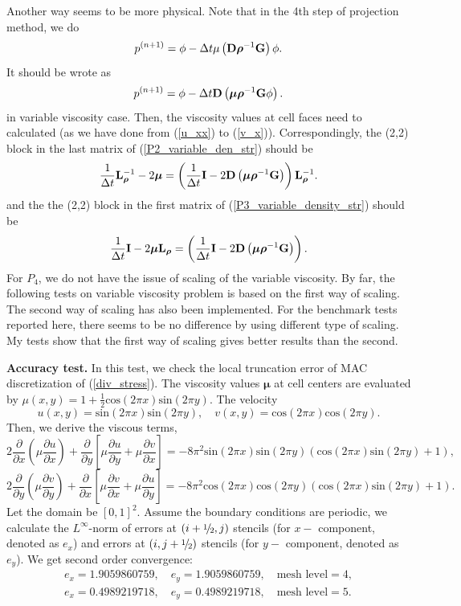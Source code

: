\documentclass[9pt]{article}
\newcommand{\V}[1]{\boldsymbol{#1}}
\newcommand{\sfrac}[2]{\mathchoice
  {\kern0em\raise.5ex\hbox{\the\scriptfont0 #1}\kern-.15em/
   \kern-.15em\lower.25ex\hbox{\the\scriptfont0 #2}}
  {\kern0em\raise.5ex\hbox{\the\scriptfont0 #1}\kern-.15em/
   \kern-.15em\lower.25ex\hbox{\the\scriptfont0 #2}}
  {\kern0em\raise.5ex\hbox{\the\scriptscriptfont0 #1}\kern-.2em/
   \kern-.15em\lower.25ex\hbox{\the\scriptscriptfont0 #2}}
  {#1\!/#2}}
\def\myhalf {\sfrac{1}{2}}
\begin{document}
Another way seems to be more physical. Note that in the 4th step of projection method, we do
$$
p^{(n+1)}=\phi -  \Delta t \mu  \left({\bf D} {\V{\rho}}^{-1} {\bf G} \right)\phi.
$$
It should be wrote as
\begin{equation}\label{pressure_correction_var}
p^{(n+1)}=\phi -  \Delta t  {\bf D}\left({{\V{\mu}}\V{\rho}}^{-1} {\bf G} \phi \right).
\end{equation}
in variable viscosity case. Then, the viscosity values at cell faces need to calculated (as we have done from (\ref{u_xx}) to (\ref{v_x})). Correspondingly, the (2,2) block in the last matrix of (\ref{P2_variable_den_str}) should be
$$
\displaystyle \frac{1}{\Delta t} {\bf L}_{\V{\rho}}^{-1} - 2{\V{\mu}}=\left(\frac{1}{\Delta t}{\bf I}  - 2{\bf D}\left({{\V{\mu}}\V{\rho}}^{-1} {\bf G}\right)\right){\bf L}_{\V{\rho}}^{-1}.
$$
and the the (2,2) block in the first matrix of (\ref{P3_variable_density_str}) should be
$$
\displaystyle \frac{1}{\Delta t}{\bf I}- 2{\V{\mu}} {\bf L}_{\V{\rho}}=\left(\frac{1}{\Delta t}{\bf I}- 2{\bf D}\left({{\V{\mu}}\V{\rho}}^{-1} {\bf G}\right)\right).
$$
For $P_4$, we do not have the issue of scaling of the variable viscosity. By far, the following tests on variable viscosity problem is based on the first way of scaling. The second way of scaling has also been implemented. For the benchmark tests reported here, there seems to be no difference by using different type of scaling. My tests show that the first way of scaling gives better results than the second.

{\bf Accuracy test.} In this test, we check the local truncation error of MAC discretization of (\ref{div_stress}).
The viscosity values ${\V{\mu}}$ at cell centers are evaluated by $\mu(x, y)=1+\frac{1}{2}\mbox{cos}(2 \pi x)\mbox{sin}(2\pi y)$. The velocity
$$
u(x, y)=\mbox{sin}(2\pi x)\mbox{sin}(2 \pi y), \quad v(x, y)=\mbox{cos}(2 \pi x)\mbox{cos}(2 \pi y).
$$
Then, we derive the viscous terms,
$$
2\frac{\partial}{\partial x}\left(\mu \frac{\partial u}{\partial x}\right) + \frac{\partial}{\partial y}\left[\mu \frac{\partial u}{\partial y} + \mu \frac{\partial v}{\partial x}\right]=-8 {\pi}^2 \mbox{sin}(2 \pi x) \mbox{sin}(2 \pi y)(\mbox{cos}(2 \pi x) \mbox{sin}(2 \pi y)+1),
$$
$$
2\frac{\partial}{\partial y}\left(\mu \frac{\partial v}{\partial y}\right) + \frac{\partial}{\partial x}\left[\mu \frac{\partial v}{\partial x} + \mu \frac{\partial u}{\partial y}\right]=-8 {\pi}^2 \mbox{cos}(2 \pi x)\mbox{cos}(2 \pi y) (\mbox{cos}(2 \pi x)\mbox{sin}(2 \pi y)+1).
$$
Let the domain be $[0, 1]^2$. Assume the boundary conditions are periodic, we calculate the $L^{\infty}$-norm of errors at $(i+\myhalf, j)$ stencils (for $x-$ component, denoted as $e_x$) and errors at $(i, j+\myhalf)$ stencils (for $y-$ component, denoted as $e_y$).
We get second order convergence:
$$
\begin{array}{ccc}
e_x=   1.9059860759, \quad e_y=1.9059860759, \quad \mbox{mesh level}=4, \\
e_x=   0.4989219718, \quad e_y=0.4989219718, \quad \mbox{mesh level}=5.
\end{array}
$$
\end{document}
